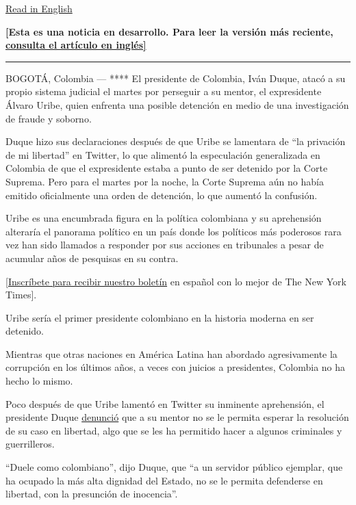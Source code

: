 \href{https://www.nytimes.com/2020/08/04/world/americas/colombia-president-uribe-charged.html}{Read
in English}

\textbf{{[}Esta es una noticia en desarrollo. Para leer la versión más
reciente,}
\textbf{\href{https://www.nytimes.com/2020/08/04/world/americas/colombia-president-uribe-charged.html}{consulta
el artículo en inglés{]}}}

\begin{center}\rule{0.5\linewidth}{\linethickness}\end{center}

BOGOTÁ, Colombia --- **** El presidente de Colombia, Iván Duque, atacó a
su propio sistema judicial el martes por perseguir a su mentor, el
expresidente Álvaro Uribe, quien enfrenta una posible detención en medio
de una investigación de fraude y soborno.

Duque hizo sus declaraciones después de que Uribe se lamentara de ``la
privación de mi libertad'' en Twitter, lo que alimentó la especulación
generalizada en Colombia de que el expresidente estaba a punto de ser
detenido por la Corte Suprema. Pero para el martes por la noche, la
Corte Suprema aún no había emitido oficialmente una orden de detención,
lo que aumentó la confusión.

Uribe es una encumbrada figura en la política colombiana y su
aprehensión alteraría el panorama político en un país donde los
políticos más poderosos rara vez han sido llamados a responder por sus
acciones en tribunales a pesar de acumular años de pesquisas en su
contra.

\href{https://www.nytimes.com/newsletters/el-times}{{[}Inscríbete para
recibir nuestro boletín} en español con lo mejor de The New York
Times{]}.

Uribe sería el primer presidente colombiano en la historia moderna en
ser detenido.

Mientras que otras naciones en América Latina han abordado agresivamente
la corrupción en los últimos años, a veces con juicios a presidentes,
Colombia no ha hecho lo mismo.

Poco después de que Uribe lamentó en Twitter su inminente aprehensión,
el presidente Duque
\href{https://twitter.com/IvanDuque/status/1290755832330813442}{denunció}
que a su mentor no se le permita esperar la resolución de su caso en
libertad, algo que se les ha permitido hacer a algunos criminales y
guerrilleros.

``Duele como colombiano'', dijo Duque, que ``a un servidor público
ejemplar, que ha ocupado la más alta dignidad del Estado, no se le
permita defenderse en libertad, con la presunción de inocencia''.

